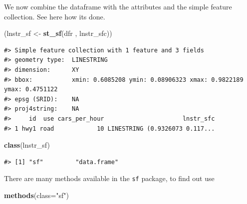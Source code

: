\documentclass[]{book}
\newenvironment{Shaded}{\begin{snugshade}}{\end{snugshade}}
\newcommand{\KeywordTok}[1]{\textcolor[rgb]{0.13,0.29,0.53}{\textbf{#1}}}
\newcommand{\DataTypeTok}[1]{\textcolor[rgb]{0.13,0.29,0.53}{#1}}
\newcommand{\StringTok}[1]{\textcolor[rgb]{0.31,0.60,0.02}{#1}}
\newcommand{\NormalTok}[1]{#1}
\theoremstyle{definition}
\theoremstyle{definition}
\theoremstyle{definition}
\theoremstyle{remark}
\begin{document}
We now combine the dataframe with the attributes and the simple feature
collection. See here how its done.

\begin{Shaded}
\begin{Highlighting}[]
\NormalTok{(lnstr_sf <-}\StringTok{ }\KeywordTok{st_sf}\NormalTok{(dfr , lnstr_sfc))}
\end{Highlighting}
\end{Shaded}

\begin{verbatim}
#> Simple feature collection with 1 feature and 3 fields
#> geometry type:  LINESTRING
#> dimension:      XY
#> bbox:           xmin: 0.6085208 ymin: 0.08906323 xmax: 0.9822189 ymax: 0.4751122
#> epsg (SRID):    NA
#> proj4string:    NA
#>     id  use cars_per_hour                      lnstr_sfc
#> 1 hwy1 road            10 LINESTRING (0.9326073 0.117...
\end{verbatim}

\begin{Shaded}
\begin{Highlighting}[]
\KeywordTok{class}\NormalTok{(lnstr_sf)}
\end{Highlighting}
\end{Shaded}

\begin{verbatim}
#> [1] "sf"         "data.frame"
\end{verbatim}

There are many methods available in the \texttt{sf} package, to find out
use

\begin{Shaded}
\begin{Highlighting}[]
\KeywordTok{methods}\NormalTok{(}\DataTypeTok{class=}\StringTok{"sf"}\NormalTok{)}
\end{Highlighting}
\end{Shaded}
\end{document}
